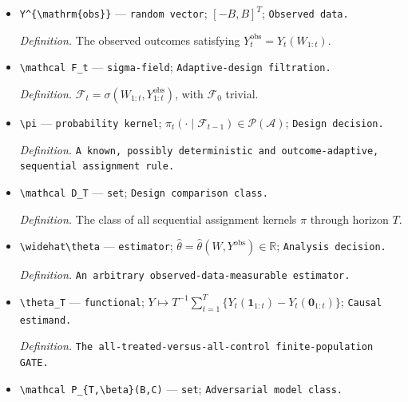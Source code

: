 \documentclass{article}
\begin{document}
\begin{itemize}
  \item \texttt{Y\textasciicircum{}\{\textbackslash{}\allowbreak{}mathrm\{obs\}\allowbreak{}\}\allowbreak{}} --- \texttt{random vector}; \([-B,B]^T\); \texttt{Observed data.}
  \par\smallskip\noindent\emph{Definition.} The observed outcomes satisfying \(Y_t^{\mathrm{obs}}=Y_t(W_{1:t})\).
  \item \texttt{\textbackslash{}\allowbreak{}mathcal F\_\allowbreak{}t} --- \texttt{sigma-\allowbreak{}field}; \texttt{Adaptive-\allowbreak{}design filtration.}
  \par\smallskip\noindent\emph{Definition.} \(\mathcal F_t=\sigma(W_{1:t},Y_{1:t}^{\mathrm{obs}})\), with \(\mathcal F_0\) trivial.
  \item \texttt{\textbackslash{}\allowbreak{}pi} --- \texttt{probability kernel}; \(\pi_t(\cdot\mid\mathcal F_{t-1})\in\mathcal P(\mathcal A)\); \texttt{Design decision.}
  \par\smallskip\noindent\emph{Definition.} \texttt{A known,\allowbreak{} possibly deterministic and outcome-\allowbreak{}adaptive,\allowbreak{} sequential assignment rule.}
  \item \texttt{\textbackslash{}\allowbreak{}mathcal D\_\allowbreak{}T} --- \texttt{set}; \texttt{Design comparison class.}
  \par\smallskip\noindent\emph{Definition.} The class of all sequential assignment kernels \(\pi\) through horizon \(T\).
  \item \texttt{\textbackslash{}\allowbreak{}widehat\textbackslash{}\allowbreak{}theta} --- \texttt{estimator}; \(\widehat\theta=\widehat\theta(W,Y^{\mathrm{obs}})\in\mathbb R\); \texttt{Analysis decision.}
  \par\smallskip\noindent\emph{Definition.} \texttt{An arbitrary observed-\allowbreak{}data-\allowbreak{}measurable estimator.}
  \item \texttt{\textbackslash{}\allowbreak{}theta\_\allowbreak{}T} --- \texttt{functional}; \(Y\mapsto T^{-1}\sum_{t=1}^T\{Y_t(\mathbf 1_{1:t})-Y_t(\mathbf 0_{1:t})\}\); \texttt{Causal estimand.}
  \par\smallskip\noindent\emph{Definition.} \texttt{The all-\allowbreak{}treated-\allowbreak{}versus-\allowbreak{}all-\allowbreak{}control finite-\allowbreak{}population GATE.}
  \item \texttt{\textbackslash{}\allowbreak{}mathcal P\_\allowbreak{}\{T,\allowbreak{}\textbackslash{}\allowbreak{}beta\}\allowbreak{}(B,\allowbreak{}C)} --- \texttt{set}; \texttt{Adversarial model class.}

\end{itemize}
\end{document}
